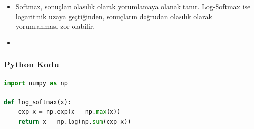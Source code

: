 \begin{itemize}
    \item Softmax, sonuçları olasılık olarak yorumlamaya olanak tanır. Log-Softmax ise logaritmik uzaya geçtiğinden, sonuçların doğrudan olasılık olarak yorumlanması zor olabilir.
    \item 
\end{itemize}

\subsubsection{Python Kodu}

\begin{lstlisting}[language=Python]
import numpy as np

def log_softmax(x):
    exp_x = np.exp(x - np.max(x))
    return x - np.log(np.sum(exp_x))
\end{lstlisting}

\newpage
